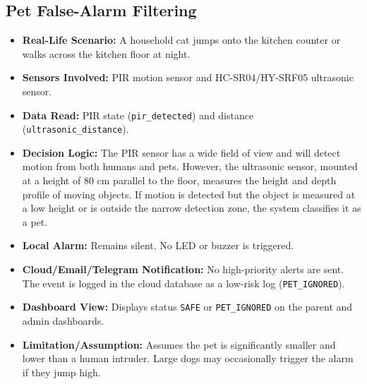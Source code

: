 \documentclass[11pt,a4paper]{report}
\begin{document}
\subsection{Pet False-Alarm Filtering}
\begin{itemize}
    \item \textbf{Real-Life Scenario:} A household cat jumps onto the kitchen counter or walks across the kitchen floor at night.
    \item \textbf{Sensors Involved:} PIR motion sensor and HC-SR04/HY-SRF05 ultrasonic sensor.
    \item \textbf{Data Read:} PIR state (\texttt{pir\_detected}) and distance (\texttt{ultrasonic\_distance}).
    \item \textbf{Decision Logic:} The PIR sensor has a wide field of view and will detect motion from both humans and pets. However, the ultrasonic sensor, mounted at a height of 80 cm parallel to the floor, measures the height and depth profile of moving objects. If motion is detected but the object is measured at a low height or is outside the narrow detection zone, the system classifies it as a pet.
    \item \textbf{Local Alarm:} Remains silent. No LED or buzzer is triggered.
    \item \textbf{Cloud/Email/Telegram Notification:} No high-priority alerts are sent. The event is logged in the cloud database as a low-risk log (\texttt{PET\_IGNORED}).
    \item \textbf{Dashboard View:} Displays status \texttt{SAFE} or \texttt{PET\_IGNORED} on the parent and admin dashboards.
    \item \textbf{Limitation/Assumption:} Assumes the pet is significantly smaller and lower than a human intruder. Large dogs may occasionally trigger the alarm if they jump high.
\end{itemize}
\end{document}
